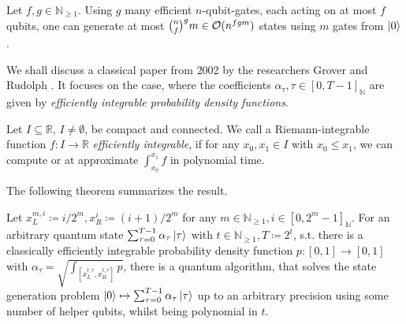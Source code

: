 \begin{theorem}
    Let \(f, g \in \mathbb{N}_{\geq 1}\). Using \(g\) many efficient \(n\)-qubit-gates, each acting on at most \(f\) qubits, one can generate at most \(\binom{n}{f}^gm \in \operatorname{\mathcal{O}}(n^{fgm})\) states using \(m\) gates from \(\ket{0}\).
\end{theorem}

We shall discuss a classical paper from 2002 by the researchers Grover and Rudolph \cite{Grover2002}. It focuses on the case, where the coefficients \(\alpha_\tau, \tau \in [0, T-1]_{\mathbb{N}}\) are given by \emph{efficiently integrable probability density functions}.

\begin{definition}
    Let \(I \subseteq \mathbb{R}\), \(I \neq \emptyset\), be compact and connected. We call a Riemann-integrable function \(f\colon I \to \mathbb{R}\) \emph{efficiently integrable}, if for any \(x_0, x_1 \in I\) with \(x_0 \leq x_1\), we can compute or at approximate \(\int_{x_0}^{x_1} f\) in polynomial time.
\end{definition}

The following theorem summarizes the result.

\begin{theorem} \label{qsg_using_efficient_integrable_probability_distributions}
    Let \(x_L^{m, i} \coloneqq i/2^m, x_R^i \coloneqq (i+1)/2^m\) for any \(m \in \mathbb{N}_{\geq 1}, i \in [0, 2^m-1]_{\mathbb{N}}\). For an arbitrary quantum state \(\sum_{\tau = 0}^{T-1} \alpha_\tau \ket{\tau}\) with \(t \in \mathbb{N}_{\geq 1}, T \coloneqq 2^t\), s.t. there is a classically efficiently integrable probability density function \(p\colon [0, 1] \to [0, 1]\) with \(\alpha_\tau = \sqrt{\int_{[x_L^{t, \tau}, x_R^{t, \tau}]} p}\), there is a quantum algorithm, that solves the state generation problem \(\ket{0} \mapsto \sum_{\tau = 0}^{T-1} \alpha_\tau \ket{\tau}\) up to an arbitrary precision using some number of helper qubits, whilst being polynomial in \(t\).
\end{theorem}


